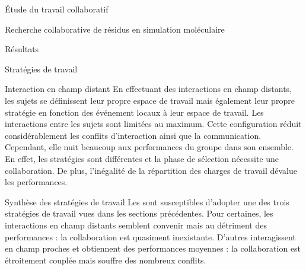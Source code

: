 \documentclass[myfrancais]{mythesis}
\begin{document}
\begin{mypart}{Étude du travail collaboratif}
\begin{mychapter}{Recherche collaborative de résidus en simulation moléculaire}
\begin{mysection}{Résultats}
\begin{mysubsection}{Stratégies de travail}
\begin{mysubsubsection}{Interaction en champ distant}
						En effectuant des interactions en champ distants, les sujets se définissent leur propre espace de travail mais également leur propre stratégie en fonction des événement locaux à leur espace de travail.
						Les interactions entre les sujets sont limitées au maximum.
						Cette configuration réduit considérablement les conflits d'interaction ainsi que la communication.
						Cependant, elle nuit beaucoup aux performances du groupe dans son ensemble.
						En effet, les stratégies sont différentes et la phase de sélection nécessite une collaboration.
						De plus, l'inégalité de la répartition des charges de travail dévalue les performances.
					\end{mysubsubsection}
					\begin{mysubsubsection}{Synthèse des stratégies de travail}
						Les  sont susceptibles d'adopter une des trois stratégies de travail vues dans les sections précédentes.
						Pour certaines, les interactions en champ distants semblent convenir mais au détriment des performances : la collaboration est quasiment inexistante.
						D'autres  interagissent en champ proches et obtiennent des performances moyennes : la collaboration est étroitement couplée mais souffre des nombreux conflits.


\end{mysubsubsection}
\end{mysubsection}
\end{mysection}
\end{mychapter}
\end{mypart}
\end{document}
